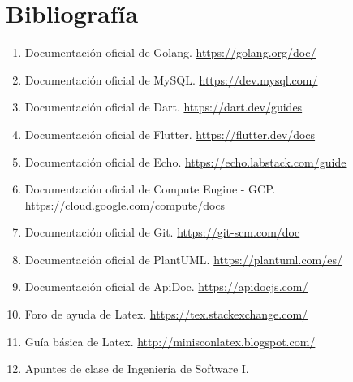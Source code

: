 \chapter{Bibliografía}
\label{ch:capitulo9} 

\begin{enumerate}
	\item Documentación oficial de Golang. \url{https://golang.org/doc/}
	\item Documentación oficial de MySQL. \url{https://dev.mysql.com/}
	\item Documentación oficial de Dart. \url{https://dart.dev/guides}
	\item Documentación oficial de Flutter. \url{https://flutter.dev/docs}
	\item Documentación oficial de Echo. \url{https://echo.labstack.com/guide}
	\item Documentación oficial de Compute Engine - GCP. \url{https://cloud.google.com/compute/docs}
	\item Documentación oficial de Git. \url{https://git-scm.com/doc}
	\item Documentación oficial de PlantUML. \url{https://plantuml.com/es/}
	\item Documentación oficial de ApiDoc. \url{https://apidocjs.com/}
	\item Foro de ayuda de Latex. \url{https://tex.stackexchange.com/}
	\item Guía básica de Latex. \url{http://minisconlatex.blogspot.com/}
	\item Apuntes de clase de Ingeniería de Software I.
\end{enumerate}